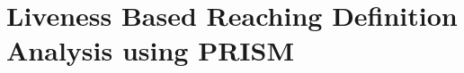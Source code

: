 \documentclass[11pt,a4paper,openright]{report}
\begin{document}
\chapter{Liveness Based Reaching Definition Analysis using PRISM}

\end{document}
